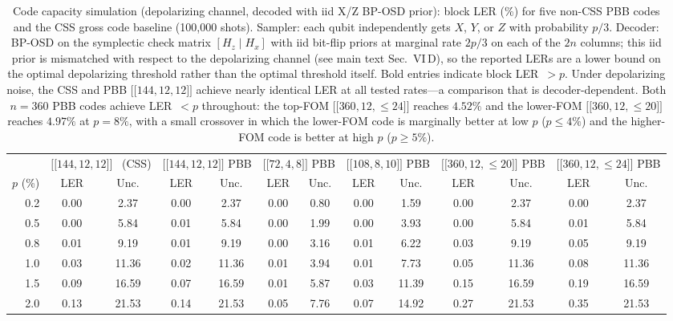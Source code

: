 \documentclass[aps,prxquantum,twocolumn,superscriptaddress,nofootinbib]{revtex4-2}
\newcommand{\dblbrk}[1]{\ensuremath{\lbrack\!\lbrack #1 \rbrack\!\rbrack}}
\newcommand{\code}[1]{\dblbrk{#1}}
\begin{document}
\begin{table}[t]
\centering
\caption{Code capacity simulation (depolarizing channel, decoded with iid X/Z BP-OSD prior): block LER (\%) for five non-CSS PBB codes and the CSS gross code baseline (100{,}000 shots).
Sampler: each qubit independently gets $X$, $Y$, or $Z$ with probability $p/3$.
Decoder: BP-OSD on the symplectic check matrix $[H_z \mid H_x]$ with iid bit-flip priors at marginal rate $2p/3$ on each of the $2n$ columns; this iid prior is mismatched with respect to the depolarizing channel (see main text Sec.~VI\,D), so the reported LERs are a lower bound on the optimal depolarizing threshold rather than the optimal threshold itself.
Bold entries indicate block LER~$> p$.
Under depolarizing noise, the CSS and PBB $\code{144,12,12}$ achieve nearly identical LER at all tested rates---a comparison that is decoder-dependent.
Both $n=360$ PBB codes achieve LER~$<p$ throughout: the top-FOM $\code{360,12,{\leq}24}$ reaches $4.52\%$ and the lower-FOM $\code{360,12,{\leq}20}$ reaches $4.97\%$ at $p=8\%$, with a small crossover in which the lower-FOM code is marginally better at low $p$ ($p \leq 4\%$) and the higher-FOM code is better at high $p$ ($p \geq 5\%$).}
\label{tab:threshold_depolarizing_full}
\small
\setlength{\tabcolsep}{3pt}
\begin{tabular}{r|cc|cc|cc|cc|cc|cc}
\toprule
& \multicolumn{2}{c|}{$\code{144,12,12}$~\cite{bravyi2024high} (CSS)} & \multicolumn{2}{c|}{$\code{144,12,12}$ PBB} & \multicolumn{2}{c|}{$\code{72,4,8}$ PBB} & \multicolumn{2}{c|}{$\code{108,8,10}$ PBB} & \multicolumn{2}{c|}{$\code{360,12,{\leq}20}$ PBB} & \multicolumn{2}{c}{$\code{360,12,{\leq}24}$ PBB} \\
$p$ (\%) & LER & Unc. & LER & Unc. & LER & Unc. & LER & Unc. & LER & Unc. & LER & Unc. \\
\midrule
0.2 & 0.00 & 2.37 & 0.00 & 2.37 & 0.00 & 0.80 & 0.00 & 1.59 & 0.00 & 2.37 & 0.00 & 2.37 \\
0.5 & 0.00 & 5.84 & 0.01 & 5.84 & 0.00 & 1.99 & 0.00 & 3.93 & 0.00 & 5.84 & 0.01 & 5.84 \\
0.8 & 0.01 & 9.19 & 0.01 & 9.19 & 0.00 & 3.16 & 0.01 & 6.22 & 0.03 & 9.19 & 0.05 & 9.19 \\
1.0 & 0.03 & 11.36 & 0.02 & 11.36 & 0.01 & 3.94 & 0.01 & 7.73 & 0.05 & 11.36 & 0.08 & 11.36 \\
1.5 & 0.09 & 16.59 & 0.07 & 16.59 & 0.01 & 5.87 & 0.03 & 11.39 & 0.15 & 16.59 & 0.19 & 16.59 \\
2.0 & 0.13 & 21.53 & 0.14 & 21.53 & 0.05 & 7.76 & 0.07 & 14.92 & 0.27 & 21.53 & 0.35 & 21.53 \\

\end{tabular}
\end{table}
\end{document}
